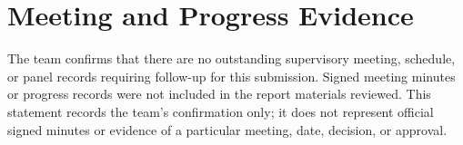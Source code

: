 \chapter{Meeting and Progress Evidence}
The team confirms that there are no outstanding supervisory meeting, schedule, or panel records requiring follow-up for this submission. Signed meeting minutes or progress records were not included in the report materials reviewed. This statement records the team's confirmation only; it does not represent official signed minutes or evidence of a particular meeting, date, decision, or approval.
